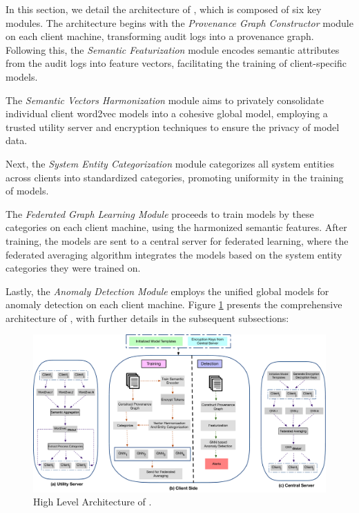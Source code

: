 In this section, we detail the architecture of \Sys, which is composed of six key modules. The architecture begins with the \textit{Provenance Graph Constructor} module on each client machine, transforming audit logs into a provenance graph. Following this, the \textit{Semantic Featurization} module encodes semantic attributes from the audit logs into feature vectors, facilitating the training of client-specific \gnnshort models.

The \textit{Semantic Vectors Harmonization} module aims to privately consolidate individual client word2vec models into a cohesive global model, employing a trusted utility server and encryption techniques to ensure the privacy of model data.

Next, the \textit{System Entity Categorization} module categorizes all system entities across clients into standardized categories, promoting uniformity in the training of \gnnshort models.

The \textit{Federated Graph Learning Module} proceeds to train \gnnshort models by these categories on each client machine, using the harmonized semantic features. After training, the models are sent to a central server for federated learning, where the federated averaging algorithm integrates the models based on the system entity categories they were trained on.

Lastly, the \textit{Anomaly Detection Module} employs the unified global models for anomaly detection on each client machine. Figure \ref{fig:arch} presents the comprehensive architecture of \Sys, with further details in the subsequent subsections:

\begin{figure}[t!]
  \centering
  \includegraphics[width=\textwidth]{fig/archv2.pdf}
  \caption{High Level Architecture of \Sys.}
  \vspace{-3ex}
  \label{fig:arch}
\end{figure}


